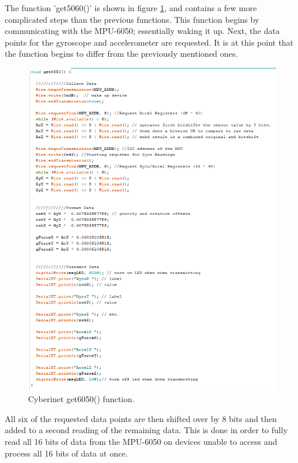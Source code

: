 The function 'get5060()' is shown in figure \ref{fig:get6050}, and contains a few more complicated steps than the previous functions. This function begins by communicating with the MPU-6050; essentially waking it up. Next, the data points for the gyroscope and accelerometer are requested. It is at this point that the function begins to differ from the previously mentioned ones.

\begin{center}
    \begin{figure}
        \centering
        \includegraphics[scale=1.5]{diagrams/maxPatches/get6050.png}
        \caption{Cyberinet get6050() function.}
        \label{fig:get6050}
    \end{figure}
\end{center}

All six of the requested data points are then shifted over by 8 bits and then added to a second reading of the remaining data. This is done in order to fully read all 16 bits of data from the MPU-6050 on devices unable to access and process all 16 bits of data at once. 


